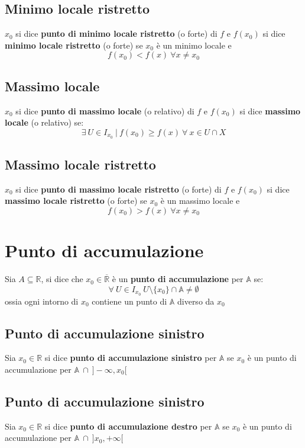 \subsection{Minimo locale ristretto}
$x_0$ si dice \textbf{punto di minimo locale ristretto} (o forte) di $f$ e $f(x_0)$ si dice \textbf{minimo locale ristretto} (o forte) se $x_0$ è un minimo locale e
\begin{equation}
f(x_0)<f(x)\ \forall x \neq x_0
\end{equation}
\subsection{Massimo locale}
$x_0$ si dice \textbf{punto di massimo locale} (o relativo) di $f$ e $f(x_0)$ si dice \textbf{massimo locale} (o relativo) se:
\begin{equation}
\exists \ U \in I_{x_0}\ |\ f(x_0) \geq f(x)\ \forall\ x \in U \cap X
\end{equation}
\subsection{Massimo locale ristretto}
$x_0$ si dice \textbf{punto di massimo locale ristretto} (o forte) di $f$ e $f(x_0)$ si dice \textbf{massimo locale ristretto} (o forte) se $x_0$ è un massimo locale e
\begin{equation}
f(x_0)>f(x)\ \forall x \neq x_0
\end{equation}

\section{Punto di accumulazione}
Sia $A \subseteq \mathbb{R}$, si dice che $x_0 \in \overline{\mathbb{R}}$ \`e un \textbf{punto di accumulazione} per $\mathbb{A}$ se:
\begin{equation}
\forall\ U \in I_{x_0}\ U \setminus \{x_0\} \cap \mathbb{A} \neq \emptyset
\end{equation}
ossia ogni intorno di $x_0$ contiene un punto di $\mathbb{A}$ diverso da $x_0$
\subsection{Punto di accumulazione sinistro}
Sia $x_0 \in \mathbb{R}$ si dice \textbf{punto di accumulazione sinistro} per $\mathbb{A}$ se $x_0$ \`e un punto di accumulazione per $\mathbb{A}\ \cap\ ]-\infty,x_0[$
\subsection{Punto di accumulazione sinistro}
Sia $x_0 \in \mathbb{R}$ si dice \textbf{punto di accumulazione destro} per $\mathbb{A}$ se $x_0$ \`e un punto di accumulazione per $\mathbb{A}\ \cap\ ]x_0,+\infty[$
